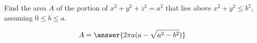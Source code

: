 \documentclass{ximera}
\author{David Guichard \and Neal Koblitz \and H. Jerome Keisler \and Albert Scheller \and Barry Balof \and Mike Wills \and Matthew Carr}
\begin{document}
\begin{exercise}




Find the area $A$ of the portion of $x^2+y^2+z^2=a^2$ that lies above $x^2+y^2\le b^2$, assuming $0\le b\le a$. 

\begin{prompt}
\[
A=\answer{2\pi a(a-\sqrt{a^2-b^2})}
\]
\end{prompt}


\end{exercise}
\end{document}
